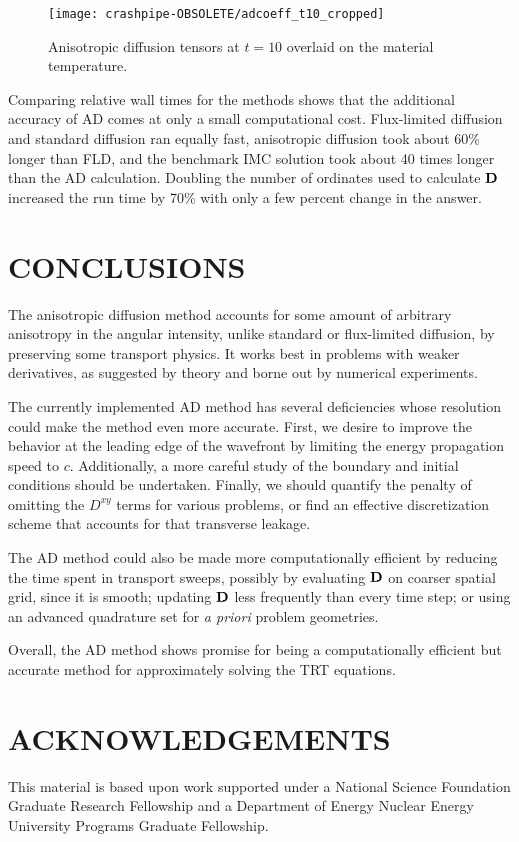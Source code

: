 \documentclass[11pt,letter,twoside]{mc2011}
\begin{document}
\begin{figure}[htb]
  \centering
  \texttt{[image: crashpipe-OBSOLETE/adcoeff\_t10\_cropped]}
  \caption{Anisotropic diffusion tensors at $t=10$ overlaid on the material
  temperature.}
  \label{fig:adcoeff}
\end{figure}

Comparing relative wall times for the methods shows that the additional
accuracy of AD comes at only a small computational cost. Flux-limited diffusion
and standard diffusion ran
equally fast, anisotropic diffusion took about 60\% longer than FLD, and the
benchmark IMC solution took about 40 times longer than the AD calculation.
Doubling the number of ordinates used to calculate $\mathbf{D}$ increased the run
time by 70\% with only a few percent change in the answer.
\clearpage
\section{\MakeUppercase{Conclusions}}
The anisotropic diffusion method accounts for some amount of arbitrary
anisotropy in the angular intensity, unlike standard or flux-limited diffusion,
by preserving some transport physics. It works best in problems with weaker
derivatives, as suggested by theory and borne out by numerical experiments.

The currently implemented AD method has several deficiencies whose resolution
could make the method even more accurate. First, we desire to improve the
behavior at the leading edge of the wavefront by limiting the energy
propagation speed to $c$. Additionally, a more careful study of the boundary
and initial conditions should be undertaken. Finally, we should quantify the
penalty of omitting the $D^{xy}$ terms for various problems, or find an
effective discretization scheme that accounts for that transverse leakage.

The AD method could also be made
more computationally efficient by reducing the time spent in transport sweeps,
possibly by
evaluating $\mathbf{D}$ on coarser spatial grid, since it is smooth;
updating $\mathbf{D}$ less frequently than every time step; or
using an advanced quadrature set for \emph{a priori} problem geometries.

Overall, the AD method shows promise for being a computationally efficient
but accurate method for approximately solving the TRT equations.

\section*{\MakeUppercase{Acknowledgements}}
This material is based upon work supported under a National Science Foundation
Graduate Research Fellowship and a Department of Energy Nuclear
Energy University Programs Graduate Fellowship.




\end{document}
